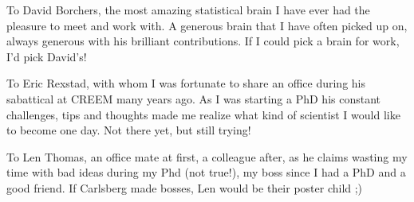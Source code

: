 \documentclass[
]{book}
\begin{document}
To David Borchers, the most amazing statistical brain I have ever had the pleasure to meet and work with. A generous brain that I have often picked up on, always generous with his brilliant contributions. If I could pick a brain for work, I'd pick David's!

To Eric Rexstad, with whom I was fortunate to share an office during his sabattical at CREEM many years ago. As I was starting a PhD his constant challenges, tips and thoughts made me realize what kind of scientist I would like to become one day. Not there yet, but still trying!

To Len Thomas, an office mate at first, a colleague after, as he claims wasting my time with bad ideas during my Phd (not true!), my boss since I had a PhD and a good friend. If Carlsberg made bosses, Len would be their poster child ;)

  
\end{document}
